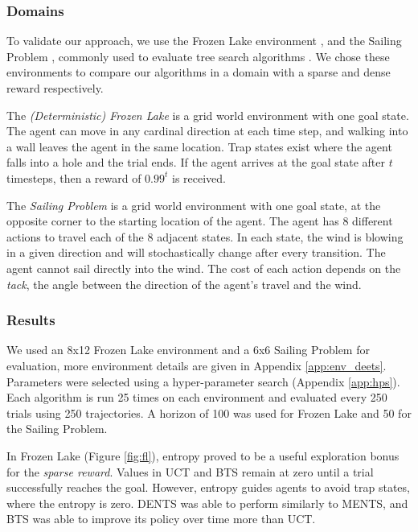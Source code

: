 \documentclass{article}
\theoremstyle{plain}
\begin{document}
    \subsubsection{Domains} \label{sec:gridworld_doms}
        To validate our approach, we use the Frozen Lake environment \cite{brockman2016openai}, and the Sailing Problem \cite{peret2004line}, commonly used to evaluate tree search algorithms \cite{peret2004line,kocsis2006uct,mcts_simple_regret,brue1}. We chose these environments to compare our algorithms in a domain with a sparse and dense reward respectively.
        
        The \emph{(Deterministic) Frozen Lake} is a grid world environment with one goal state. The agent can move in any cardinal direction at each time step, and walking into a wall leaves the agent in the same location. Trap states exist where the agent falls into a hole and the trial ends. If the agent arrives at the goal state after $t$ timesteps, then a reward of $0.99^t$ is received.
        
        The \emph{Sailing Problem} is a grid world environment with one goal state, at the opposite corner to the starting location of the agent. The agent has 8 different actions to travel each of the 8 adjacent states. In each state, the wind is blowing in a given direction and will stochastically change after every transition. The agent cannot sail directly into the wind. The cost of each action depends on the \textit{tack}, the angle between the direction of the agent's travel and the wind. %
    
    
    \subsubsection{Results}
        We used an 8x12 Frozen Lake environment and a 6x6 Sailing Problem for evaluation, more environment details are given in Appendix \ref{app:env_deets}. Parameters were selected using a hyper-parameter search (Appendix \ref{app:hps}). 
        Each algorithm is run 25 times on each environment and evaluated every 250 trials using 250 trajectories. 
        A horizon of 100 was used for Frozen Lake and 50 for the Sailing Problem.

        In Frozen Lake (Figure \ref{fig:fl}), entropy proved to be a useful exploration bonus for the \textit{sparse reward}. Values in UCT and BTS remain at zero until a trial successfully reaches the goal. However, entropy guides agents to avoid trap states, where the entropy is zero. DENTS was able to perform similarly to MENTS, and BTS was able to improve its policy over time more than UCT.
\end{document}
